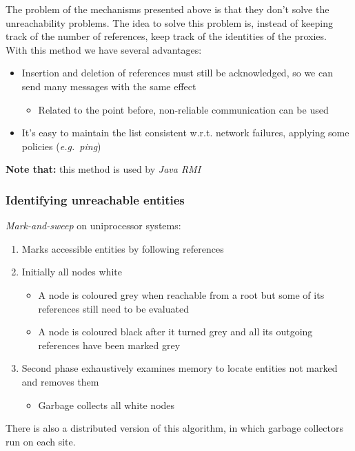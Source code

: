 The problem of the mechanisms presented above is that they don't solve the
unreachability problems. The idea to solve this problem is, instead of keeping track of the number of references, keep
track of the identities of the proxies.\\
With this method we have several advantages:
\begin{itemize}
    \item Insertion and deletion of references must still be acknowledged, so we can send many messages with the same effect
    \begin{itemize}
        \item Related to the point before, non-reliable communication can be used
    \end{itemize}
    \item It's easy to maintain the list consistent w.r.t. network failures,
      applying some policies (\emph{e.g.~ping})
\end{itemize}

\textbf{Note that:} this method is used by \emph{Java RMI}

\subsubsection{Identifying unreachable entities}

\emph{Mark-and-sweep} on uniprocessor systems:
\begin{enumerate}
    \item
      Marks accessible entities by following references
      
    \item
      Initially all nodes white
    \begin{itemize}
        \item A node is coloured grey when reachable from a root but some of its
          references still need to be evaluated
        \item A node is coloured black after it turned grey and all its outgoing
          references have been marked grey
    \end{itemize}
    
    \item
      Second phase exhaustively examines memory to locate entities not
      marked and removes them
      \begin{itemize}
        \item Garbage collects all white nodes
      \end{itemize}
\end{enumerate}

There is also a distributed version of this algorithm, in which garbage
collectors run on each site.
